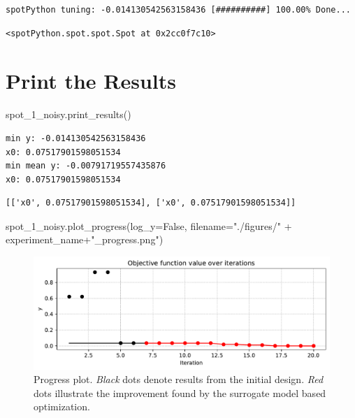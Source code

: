 \documentclass[
  letterpaper,
  DIV=11,
  numbers=noendperiod]{scrreprt}
\newenvironment{Shaded}{\begin{snugshade}}{\end{snugshade}}
\newcommand{\NormalTok}[1]{\textcolor[rgb]{0.00,0.23,0.31}{#1}}
\newcommand{\OperatorTok}[1]{\textcolor[rgb]{0.37,0.37,0.37}{#1}}
\newcommand{\StringTok}[1]{\textcolor[rgb]{0.13,0.47,0.30}{#1}}
\newcommand{\VariableTok}[1]{\textcolor[rgb]{0.07,0.07,0.07}{#1}}
\begin{document}
\begin{verbatim}
spotPython tuning: -0.014130542563158436 [##########] 100.00% Done...
\end{verbatim}

\begin{verbatim}
<spotPython.spot.spot.Spot at 0x2cc0f7c10>
\end{verbatim}

\hypertarget{print-the-results-3}{%
\section{Print the Results}\label{print-the-results-3}}

\begin{Shaded}
\begin{Highlighting}[]
\NormalTok{spot\_1\_noisy.print\_results()}
\end{Highlighting}
\end{Shaded}

\begin{verbatim}
min y: -0.014130542563158436
x0: 0.07517901598051534
min mean y: -0.00791719557435876
x0: 0.07517901598051534
\end{verbatim}

\begin{verbatim}
[['x0', 0.07517901598051534], ['x0', 0.07517901598051534]]
\end{verbatim}

\begin{Shaded}
\begin{Highlighting}[]
\NormalTok{spot\_1\_noisy.plot\_progress(log\_y}\OperatorTok{=}\VariableTok{False}\NormalTok{,}
\NormalTok{    filename}\OperatorTok{=}\StringTok{"./figures/"} \OperatorTok{+}\NormalTok{ experiment\_name}\OperatorTok{+}\StringTok{"\_progress.png"}\NormalTok{)}
\end{Highlighting}
\end{Shaded}

\begin{figure}[H]

{\centering \includegraphics{013_num_spot_noisy_files/figure-pdf/cell-12-output-1.pdf}

}

\caption{Progress plot. \emph{Black} dots denote results from the
initial design. \emph{Red} dots illustrate the improvement found by the
surrogate model based optimization.}

\end{figure}
\end{document}
